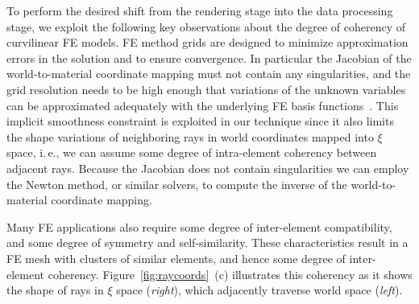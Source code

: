 \documentclass[journal]{vgtc}                %
\begin{document}
To perform the desired shift from the rendering stage into the data processing stage, we exploit the following key observations about the degree of coherency of curvilinear FE models. FE method grids are designed to minimize approximation errors in the solution and to ensure convergence. In particular the Jacobian of the world-to-material coordinate mapping must not contain any singularities, and the grid resolution needs to be high enough that variations of the unknown variables can be approximated adequately with the underlying FE basis functions~\cite{knupp07meshquality}. This implicit smoothness constraint is exploited in our technique since it also limits the shape variations of neighboring rays in world coordinates mapped into $\xi$ space, i.\,e., we can assume some degree of intra-element coherency between adjacent rays. Because the Jacobian does not contain singularities we can employ the Newton method, or similar solvers, to compute the inverse of the world-to-material coordinate mapping.

Many FE applications also require some degree of inter-element compatibility, and some degree of symmetry and self-similarity. These characteristics result in a FE mesh with clusters of similar elements, and hence some degree of inter-element coherency. Figure~\ref{fig:raycoords}~(c) illustrates this coherency as it shows the shape of rays in $\xi$ space ({\it right}), which adjacently traverse world space ({\it left}).
\end{document}

